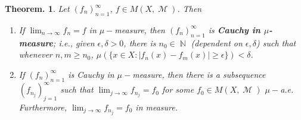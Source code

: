 \documentclass[11pt, a4paper]{memoir}
\DeclareMathOperator{\N}{{\mathbb{N}}}
\theoremstyle{change}
\newtheorem{theorem}{Theorem.}[section]
\theoremstyle{plain}
\theoremstyle{nonumberplain}
\DeclareMathOperator{\M}{{\mathcal{M}}}
\numberwithin{equation}{section}
\begin{document}
\begin{theorem}
    Let $(f_n)_{n=1}^\infty$, $f\in M(X,\M)$.
    Then
    \begin{enumerate}[nl,r]
        \item If $\lim_{n\to\infty}f_n=f$ in $\mu-$measure, then $(f_n)_{n=1}^\infty$ is \textbf{Cauchy in $\mu$-measure}; i.e., given $\epsilon,\delta>0$, there is $n_0\in\N$ (dependent on $\epsilon,\delta$) such that whenever $n,m\geq n_0$, $\mu(\{x\in X:|f_n(x)-f_m(x)|\geq\epsilon\})<\delta$.
        \item If $(f_n)_{n=1}^\infty$ is Cauchy in $\mu-$measure, then there is a subsequence $(f_{n_j})_{j=1}^\infty$ such that $\lim_{j\to\infty}f_{n_j}=f_0$ for some $f_0\in M(X,\M)$ $\mu-$a.e.
            Furthermore, $\lim_{j\to\infty}f_{n_j}=f_0$ in measure.
    \end{enumerate}
\end{theorem}
\end{document}
